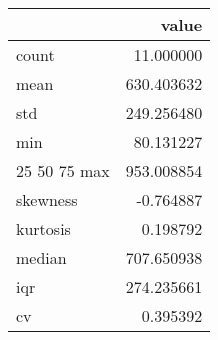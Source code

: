 \begin{tabular}{lr}
\toprule
 & value \\
\midrule
count & 11.000000 \\
mean & 630.403632 \\
std & 249.256480 \\
min & 80.131227 \\
25%
50%
75%
max & 953.008854 \\
skewness & -0.764887 \\
kurtosis & 0.198792 \\
median & 707.650938 \\
iqr & 274.235661 \\
cv & 0.395392 \\
\bottomrule
\end{tabular}
